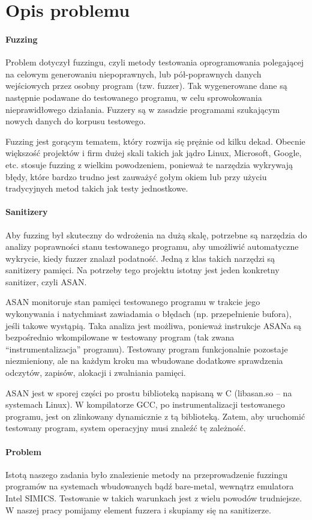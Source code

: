 \documentclass[../main.tex]{subfiles}
\begin{document}
\section{Opis problemu}
\paragraph{Fuzzing}
Problem dotyczył fuzzingu, czyli metody testowania oprogramowania polegającej
na celowym generowaniu niepoprawnych, lub pół-poprawnych danych wejściowych
przez osobny program (tzw. fuzzer). Tak wygenerowane dane są następnie podawane
do testowanego programu, w celu sprowokowania nieprawidłowego działania.
Fuzzery są w zasadzie programami szukającym nowych danych do korpusu testowego.

Fuzzing jest gorącym tematem, który rozwija się prężnie od kilku dekad. Obecnie
większość projektów i firm dużej skali takich jak jądro Linux, Microsoft,
Google, etc. stosuje  fuzzing z wielkim powodzeniem, ponieważ te narzędzia
wykrywają błędy, które bardzo trudno jest zauważyć gołym okiem lub przy użyciu
tradycyjnych metod takich jak testy jednostkowe.

\paragraph{Sanitizery}
Aby fuzzing był skuteczny do wdrożenia na dużą skalę, potrzebne są narzędzia do
analizy poprawności stanu testowanego programu, aby umożliwić automatyczne
wykrycie, kiedy fuzzer znalazł podatność. Jedną z klas takich narzędzi są
sanitizery pamięci. Na potrzeby tego projektu istotny jest jeden konkretny
sanitizer, czyli ASAN.

ASAN monitoruje stan pamięci testowanego programu w trakcie jego wykonywania i
natychmiast zawiadamia o błędach (np. przepełnienie bufora), jeśli takowe
wystąpią. Taka analiza jest możliwa, ponieważ instrukcje ASANa są bezpośrednio
wkompilowane w testowany program (tak zwana “instrumentalizacja” programu).
Testowany program funkcjonalnie pozostaje niezmieniony, ale na każdym kroku ma
wbudowane dodatkowe sprawdzenia odczytów, zapisów, alokacji i zwalniania
pamięci.

ASAN jest w sporej części po prostu biblioteką napisaną w C (libasan.so -- na
systemach Linux). W kompilatorze GCC, po instrumentalizacji testowanego
programu, jest on zlinkowany dynamicznie z tą biblioteką. Zatem, aby uruchomić
testowany program, system operacyjny musi znaleźć tę zależność.

\paragraph{Problem}
Istotą naszego zadania było znalezienie metody na przeprowadzenie fuzzingu
programów na systemach wbudowanych bądź bare-metal, wewnątrz emulatora Intel
SIMICS. Testowanie w takich warunkach jest z wielu powodów trudniejsze. W
naszej pracy pomijamy element fuzzera i skupiamy się na sanitizerze.
\end{document}
